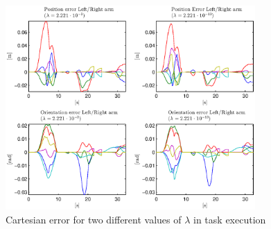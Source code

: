 \begin{figure}
\vspace{2 mm}
\centering
\includegraphics[width=0.85\textwidth]{images/wholebody/Cartesian_error.eps}
\caption{Cartesian error for two different values of $\lambda$ in task execution}
\label{Cartesian_error}
\end{figure}


